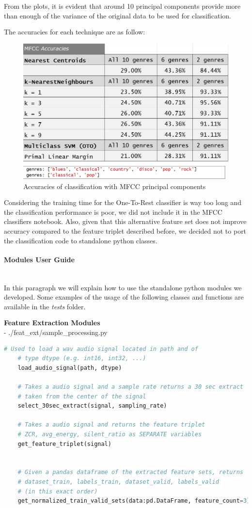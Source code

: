 \documentclass[12pt]{article}
\begin{document}
	From the plots, it is evident that around 10 principal components provide more than enough of the variance of the original data to be used for classification.
	
	The accuracies for each technique are as follow:
	\begin{figure}[H]
		\hspace{120pt}\includegraphics[scale=0.44]{mfcc_acc}
		\caption{Accuracies of classification with MFCC principal components}
	\end{figure}
	Considering the training time for the One-To-Rest classifier is way too long and the classification performance is poor, we did not include it in the MFCC classifiers notebook.
	Also, given that this alternative feature set does not improve accuracy compared to the feature triplet described before, we decided not to port the classification code to standalone python classes.
	\newpage
	
	\paragraph{Modules User Guide}\mbox{}\\
	In this paragraph we will explain how to use the standalone python modules we developed. Some examples of the usage of the following classes and functions are available in the \textit{tests} folder.
	
	\textbf{Feature Extraction Modules}\mbox{}\\
	- ./feat\_ext/sample\_processing.py
	
	\begin{lstlisting}[language=Python]
	# Used to load a wav audio signal located in path and of
	# type dtype (e.g. int16, int32, ...)
	load_audio_signal(path, dtype)
	
	# Takes a audio signal and a sample rate returns a 30 sec extract
	# taken from the center of the signal
	select_30sec_extract(signal, sampling_rate)
		
	# Takes a audio signal and returns the feature triplet
	# ZCR, avg_energy, silent_ratio as SEPARATE variables
	get_feature_triplet(signal)
	
	
	# Given a pandas dataframe of the extracted feature sets, returns
	# dataset_train, labels_train, dataset_valid, labels_valid
	# (in this exact order)
	get_normalized_train_valid_sets(data:pd.DataFrame, feature_count=3)
	\end{lstlisting}
\end{document}
